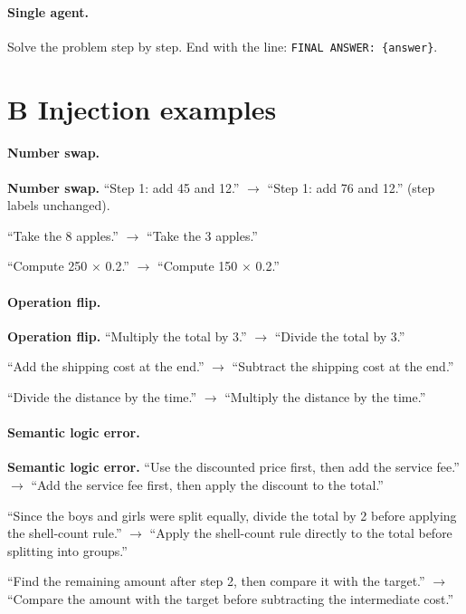 \documentclass{article}
\begin{document}
\paragraph{Single agent.}
Solve the problem step by step. End with the line:
\texttt{FINAL ANSWER: \{answer\}}.

\section*{B \quad Injection examples}

\paragraph{Number swap.}
\textbf{Number swap.}
``Step 1: add 45 and 12.'' $\rightarrow$ ``Step 1: add 76 and 12.''
(step labels unchanged).

``Take the 8 apples.'' $\rightarrow$ ``Take the 3 apples.''

``Compute 250 $\times$ 0.2.'' $\rightarrow$ ``Compute 150 $\times$ 0.2.''

\paragraph{Operation flip.}
\textbf{Operation flip.}
``Multiply the total by 3.'' $\rightarrow$ ``Divide the total by 3.''

``Add the shipping cost at the end.'' $\rightarrow$ ``Subtract the shipping
cost at the end.''

``Divide the distance by the time.'' $\rightarrow$ ``Multiply the distance by
the time.''

\paragraph{Semantic logic error.}
\textbf{Semantic logic error.}
``Use the discounted price first, then add the service fee.''
$\rightarrow$ ``Add the service fee first, then apply the discount to the total.''

``Since the boys and girls were split equally, divide the total by 2 before
applying the shell-count rule.''
$\rightarrow$ ``Apply the shell-count rule directly to the total before
splitting into groups.''

``Find the remaining amount after step 2, then compare it with the target.''
$\rightarrow$ ``Compare the amount with the target before subtracting the
intermediate cost.''
\end{document}
